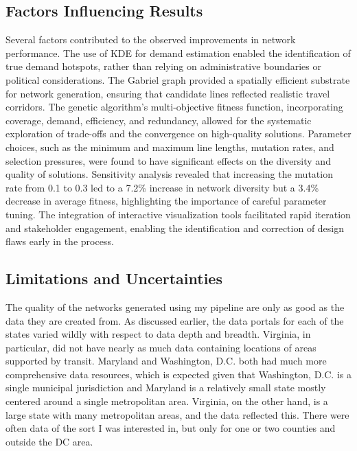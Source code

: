 \documentclass[manuscript]{acmart}
\begin{document}
\subsection{Factors Influencing Results}
Several factors contributed to the observed improvements in network performance. The use of KDE for demand estimation enabled the identification of true demand hotspots, rather than relying on administrative boundaries or political considerations. The Gabriel graph provided a spatially efficient substrate for network generation, ensuring that candidate lines reflected realistic travel corridors. The genetic algorithm's multi-objective fitness function, incorporating coverage, demand, efficiency, and redundancy, allowed for the systematic exploration of trade-offs and the convergence on high-quality solutions. Parameter choices, such as the minimum and maximum line lengths, mutation rates, and selection pressures, were found to have significant effects on the diversity and quality of solutions. Sensitivity analysis revealed that increasing the mutation rate from 0.1 to 0.3 led to a 7.2\% increase in network diversity but a 3.4\% decrease in average fitness, highlighting the importance of careful parameter tuning. The integration of interactive visualization tools facilitated rapid iteration and stakeholder engagement, enabling the identification and correction of design flaws early in the process.

\subsection{Limitations and Uncertainties}
The quality of the networks generated using my pipeline are only as good as the data they are created from. As discussed earlier, the data portals for each of the states varied wildly with respect to data depth and breadth. Virginia, in particular, did not have nearly as much data containing locations of areas supported by transit. Maryland and Washington, D.C. both had much more comprehensive data resources, which is expected given that Washington, D.C. is a single municipal jurisdiction and Maryland is a relatively small state mostly centered around a single metropolitan area. Virginia, on the other hand, is a large state with many metropolitan areas, and the data reflected this. There were often data of the sort I was interested in, but only for one or two counties and outside the DC area. 
\end{document}
